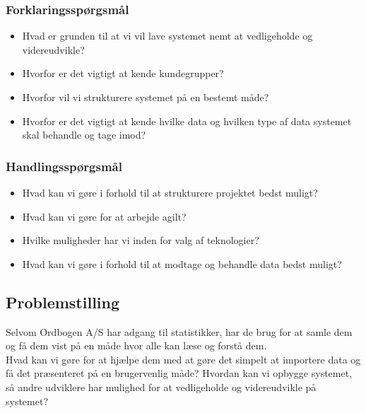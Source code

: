 \subsubsection{Forklaringsspørgsmål}
\begin{itemize}
    \item{Hvad er grunden til at vi vil lave systemet nemt at vedligeholde og videreudvikle?}
    \item{Hvorfor er det vigtigt at kende kundegrupper?}
    \item{Hvorfor vil vi strukturere systemet på en bestemt måde?}
    \item{Hvorfor er det vigtigt at kende hvilke data og hvilken type af data systemet skal behandle og tage imod?}
\end{itemize}
\subsubsection{Handlingsspørgsmål}
\begin{itemize}
    \item{Hvad kan vi gøre i forhold til at strukturere projektet bedst muligt?}
    \item{Hvad kan vi gøre for at arbejde agilt?}
    \item{Hvilke muligheder har vi inden for valg af teknologier?}
    \item{Hvad kan vi gøre i forhold til at modtage og behandle data bedst muligt?}
\end{itemize}
\subsection{Problemstilling}
Selvom Ordbogen A/S har adgang til statistikker, har de brug for at samle dem og få dem vist på en måde hvor alle kan læse og forstå dem.\\
Hvad kan vi gøre for at hjælpe dem med at gøre det simpelt at importere data og få det præsenteret på en brugervenlig måde? Hvordan kan vi opbygge systemet, så andre udviklere har mulighed for at vedligeholde og videreudvikle på systemet?
